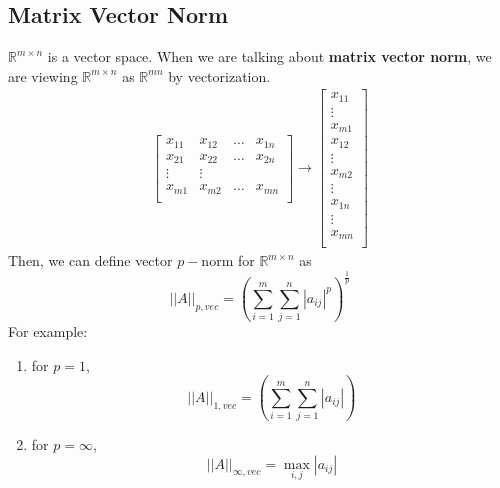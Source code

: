 \documentclass[11pt]{article}
\newcommand{\R}{\mathbb{R}}
\begin{document}
\subsection{Matrix Vector Norm}
$\R^{m \times n}$ is a vector space. When we are talking about \textbf{matrix vector norm}, we are viewing $\R^{m \times n}$ as $\R^{mn}$ by vectorization. \begin{align*}
\begin{bmatrix}
x_{11} & x_{12}& \dots& x_{1n}\\
x_{21} & x_{22}& \dots& x_{2n}\\
\vdots & \vdots& \\
x_{m1} & x_{m2}& \dots& x_{mn}\\
\end{bmatrix} \rightarrow \begin{bmatrix}
x_{11}\\
\vdots\\
x_{m1}\\
x_{12}\\
\vdots\\
x_{m2}\\
\vdots\\
x_{1n}\\
\vdots\\
x_{mn}\\
\end{bmatrix}
\end{align*}
Then, we can define vector $p-$norm for $\R^{m \times n}$ as $$||A||_{p, vec} = (\sum_{i=1}^{m} \sum_{j=1}^{n} |a_{ij}|^p )^{\frac{1}{p}}$$
For example:
\begin{enumerate}
\item for $p=1$, $$||A||_{1, vec} = (\sum_{i=1}^{m} \sum_{j=1}^{n} |a_{ij}| )$$
\item for $p=\infty$, $$||A||_{\infty, vec} = \max_{i, j} |a_{ij}|$$
\end{enumerate}
\end{document}
